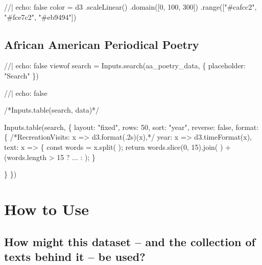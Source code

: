 \documentclass[
  letterpaper,
  DIV=11,
  numbers=noendperiod]{scrartcl}
\newenvironment{Shaded}{\begin{snugshade}}{\end{snugshade}}
\newcommand{\NormalTok}[1]{\textcolor[rgb]{0.00,0.23,0.31}{#1}}
\begin{document}
\begin{Shaded}
\begin{Highlighting}[]
\NormalTok{//| echo: false}
\NormalTok{color = d3}
\NormalTok{  .scaleLinear()}
\NormalTok{  .domain([0, 100, 300])}
\NormalTok{  .range(["\#cafcc2", "\#fce7c2", "\#eb9494"])}
\end{Highlighting}
\end{Shaded}

\subsection{African American Periodical
Poetry}\label{african-american-periodical-poetry}

\begin{Shaded}
\begin{Highlighting}[]
\NormalTok{//| echo: false}
\NormalTok{viewof search = Inputs.search(aa\_poetry\_data, \{}
\NormalTok{  placeholder: "Search"}
\NormalTok{\})}
\end{Highlighting}
\end{Shaded}

\begin{Shaded}
\begin{Highlighting}[]
\NormalTok{//| echo: false}

\NormalTok{/*Inputs.table(search, data)*/}

\NormalTok{Inputs.table(search, \{}
\NormalTok{  layout: "fixed",}
\NormalTok{  rows: 50,}
\NormalTok{  sort: "year",}
\NormalTok{  reverse: false,}
\NormalTok{  format: \{}
\NormalTok{    /*RecreationVisits: x =\textgreater{} d3.format(\textquotesingle{}.2s\textquotesingle{})(x),*/}
\NormalTok{    year: x =\textgreater{} d3.timeFormat(x),}
\NormalTok{    text: x =\textgreater{} \{}
\NormalTok{      const words = x.split(\textquotesingle{} \textquotesingle{});}
\NormalTok{      return words.slice(0, 15).join(\textquotesingle{} \textquotesingle{}) + (words.length \textgreater{} 15 ? \textquotesingle{}...\textquotesingle{} : \textquotesingle{}\textquotesingle{});}
\NormalTok{    \}}
  
\NormalTok{  \}}
\NormalTok{\})}
\end{Highlighting}
\end{Shaded}

\section{How to Use}

\subsection{\texorpdfstring{\textbf{How might this dataset -- and the
collection of texts behind it -- be used?
}}{How might this dataset -- and the collection of texts behind it -- be used? }}\label{how-might-this-dataset-and-the-collection-of-texts-behind-it-be-used}
\end{document}
